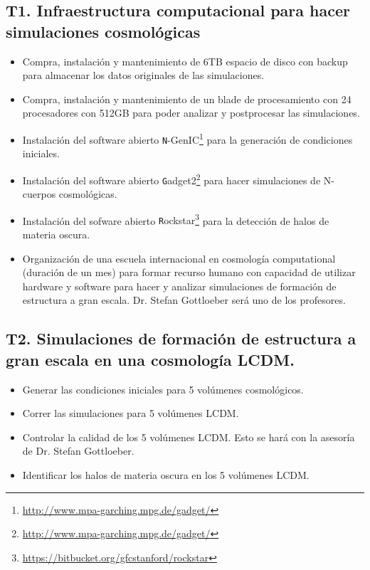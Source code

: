 \subsection*{T1. Infraestructura computacional para hacer simulaciones
  cosmol\'ogicas} 
\begin{itemize}
\item[T1.1] \tecn Compra, instalaci\'on y mantenimiento de 6TB espacio de disco
  con backup para almacenar los datos originales de las simulaciones.
\item[T1.2] \tecn Compra, instalaci\'on y mantenimiento de un blade de
  procesamiento con 24 procesadores con 512GB para poder analizar y
  postprocesar las simulaciones.
\item[T1.3] \gradA\prof Instalaci\'on del software abierto {\texttt N-GenIC}\footnote{\url{http://www.mpa-garching.mpg.de/gadget/}} para la generaci\'on de condiciones iniciales.
\item[T1.4] \gradA\prof Instalaci\'on del software abierto {\texttt
  Gadget2}\footnote{\url{http://www.mpa-garching.mpg.de/gadget/}} para hacer simulaciones de N-cuerpos cosmol\'ogicas.
\item[T1.5] \gradA\prof Instalaci\'on del sofware abierto {\texttt
  Rockstar}\footnote{\url{https://bitbucket.org/gfcstanford/rockstar}} para la detecci\'on de halos de materia oscura.
\item[T1.6] \gradA\gradB\prof Organizaci\'on de una escuela internacional en
  cosmolog\'ia computational (duraci\'on de un mes) para formar
  recurso humano con capacidad de utilizar hardware y software para
  hacer y analizar simulaciones de formaci\'on de estructura a gran
  escala. Dr. Stefan Gottloeber ser\'a uno de los profesores.
\end{itemize}

\subsection*{T2. Simulaciones de formaci\'on de estructura a gran
  escala en una cosmolog\'ia LCDM.}

\begin{itemize}
\item[T2.1] \gradA Generar las condiciones iniciales para 5 vol\'umenes
  cosmol\'ogicos. 
\item[T2.2] \gradA Correr las simulaciones para 5 vol\'umenes LCDM.
\item[T2.3] \gradA Controlar la calidad de los 5 vol\'umenes LCDM.  
Esto se har\'a con la asesor\'ia de Dr. Stefan Gottloeber.
\item[T2.4] \gradA Identificar los halos de materia oscura en los 5
  vol\'umenes LCDM.
\end{itemize}

